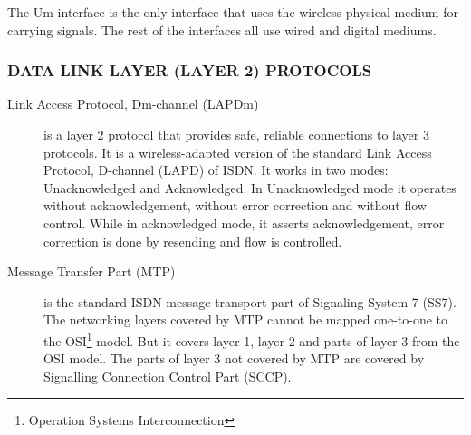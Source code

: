 The Um interface is the only interface that uses the wireless physical medium for carrying signals. The rest of the interfaces all use wired and digital mediums.

\subsubsection{\uppercase{Data Link Layer (Layer 2) protocols}}

\begin{description}
 \item [Link Access Protocol, Dm-channel (LAPDm)] is a layer 2 protocol that provides safe, reliable connections to layer 3 protocols. It is a wireless-adapted version of 
 the standard Link Access Protocol, D-channel (LAPD) of ISDN. It works in two modes: Unacknowledged and Acknowledged. In Unacknowledged mode it operates without acknowledgement,
 without error correction and without flow control. While in acknowledged mode, it asserts acknowledgement, error correction is done by resending and flow is controlled.
 \item [Message Transfer Part (MTP)] is the standard ISDN message transport part of Signaling System 7 (SS7). The networking layers covered by MTP cannot be mapped
 one-to-one to the OSI\footnote{Operation Systems Interconnection} model. But it covers layer 1, layer 2 and parts of layer 3 from the OSI model. The parts of layer 3
 not covered by MTP are covered by Signalling Connection Control Part (SCCP).
\end{description}


